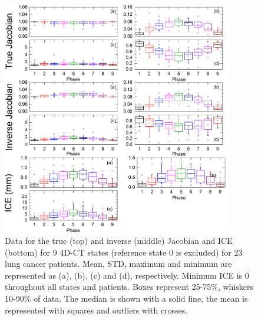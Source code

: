 \begin{figure}[H]
	\begin{center}		
		\includegraphics[width=0.9\textwidth]{./Vmm/Images/Jacobian_data.png}
		\caption{Data for the true (top) and inverse (middle) Jacobian and ICE (bottom) for 9 4D-CT states (reference state 0 is excluded) for 23 lung cancer patients. Mean, STD, maximum and minimum are represented as (a), (b), (c) and (d), respectively.
		Minimum ICE is 0 throughout all states and patients. Boxes represent 25-75\%, whiskers 10-90\%
		of data. The median is shown with a solid line, the mean is represented with squares and outliers with crosses.}
		\label{jacobian_data}
	\end{center}
\end{figure}

\newpage




